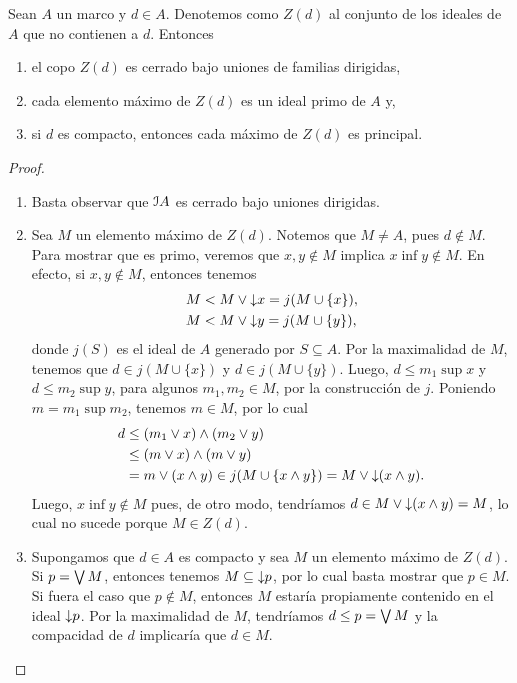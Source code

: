 \begin{lemma}
    Sean $A$ un marco y $d\in A$.
    Denotemos como $Z(d)$ al conjunto de los ideales de $A$
    que no contienen a $d$.
    Entonces
    \begin{enumerate}
        \item el copo $Z(d)$ es cerrado bajo uniones de familias
        dirigidas,
        \item cada elemento máximo de $Z(d)$ es un ideal primo de $A$ y,
        \item si $d$ es compacto, entonces cada máximo de $Z(d)$
        es principal.
    \end{enumerate}
\end{lemma}
\begin{proof}
    \begin{enumerate}
        \item Basta observar que $\cal IA$ es cerrado
        bajo uniones dirigidas.
        \item Sea $M$ un elemento máximo de $Z(d)$.
        Notemos que $M\neq A$, pues $d\nin M$.
        Para mostrar que es primo, veremos que $x,y\nin M$ implica
        $x\inf y\nin M$.
        En efecto, si $x,y\not\in M$,
        entonces tenemos
        \begin{align*}
            M&<M\sup \down x=j(M\cup\{x\}), \\
            M&<M\sup\down y = j(M\cup\{y\}),
        \end{align*}
        donde $j(S)$ es el ideal de $A$ generado por $S\subseteq A$.
        Por la maximalidad de $M$, tenemos que $d\in j(M\cup\{x\})$
        y $d\in j(M\cup\{y\})$.
        Luego, $d\leq m_1\sup x$ y $d\leq m_2\sup y$, para algunos
        $m_1,m_2\in M$, por la construcción de $j$.
        Poniendo $m=m_1\sup m_2$, tenemos $m\in M$, por lo cual
        \begin{align*}
            d   &\leq (m_1\sup x)\inf(m_2\sup y) \\
                &\leq (m\sup x)\inf(m\sup y) \\
                &=m\sup (x\inf y)
                \in j(M\cup\{x\inf y\})
                = M\sup\down(x\inf y).
        \end{align*}
        Luego, $x\inf y\nin M$ pues,
        de otro modo, tendríamos $d\in M\sup\down(x\inf y)=M$,
        lo cual no sucede porque $M\in Z(d)$.
        
        \item 
        Supongamos que $d\in A$ es compacto y sea $M$ un elemento
        máximo de $Z(d)$.
        Si $p=\Sup M$, entonces tenemos $M\subseteq\down p$,
        por lo cual basta mostrar que $p\in M$.
        Si fuera el caso que $p\nin M$,
        entonces $M$ estaría propiamente contenido
        en el ideal $\down p$.
        Por la maximalidad de $M$, tendríamos $d\leq p=\Sup M$
        y la compacidad de $d$ implicaría que $d\in M$.
    \end{enumerate}
\end{proof}


